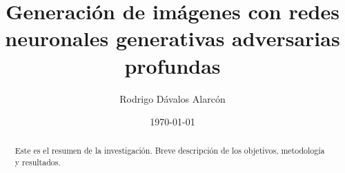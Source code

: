 \documentclass[a4paper, 12pt, twocolumn]{article}
\title{Generación de imágenes con redes neuronales generativas adversarias profundas}
\author{Rodrigo Dávalos Alarcón}
\date{\today} %
\begin{document}
\sloppy

\maketitle

\begin{abstract}
    Este es el resumen de la investigación. Breve descripción de los objetivos, metodología y resultados.
\end{abstract}












\end{document}
